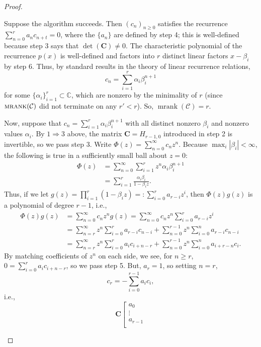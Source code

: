 \documentclass[12pt,reqno]{article}
\newcommand{\bC}{\mathbf{C}}
\newcommand{\malg}{\textsc{mrank}}
\DeclareMathOperator{\mrank}{mrank}
\begin{document}
\begin{proof}
\begin{description}
Suppose the algorithm succeeds.  Then $(c_n)_{n \geq 0}$ satisfies the recurrence $\sum_{n=0}^r a_n c_{n+t} = 0$, where the $\{a_n\}$ are defined by step 4; this is well-defined because step 3 says that $\det(\mathbf{C})\neq 0$.  The characteristic polynomial of the recurrence $p(x)$ is well-defined and factors into $r$ distinct linear factors $x-\beta_i$ by step 6.  Thus, by standard results in the theory of linear recurrence relations,
$$
c_n = \sum_{i=1}^r \alpha_i \beta_i^{n+1}
$$
for some $\{\alpha_i\}_{i=1}^r \subset \mathbb{C}$, which are nonzero by the minimality of $r$ (since $\malg(\mathcal{C})$ did not terminate on any $r' < r$).  So, $\mrank(\mathcal{C}) = r$.


Now, suppose that $c_n = \sum_{i=1}^r \alpha_i\beta_i^{n+1}$ with all distinct nonzero $\beta_i$ and nonzero values $\alpha_i$.  By $1 \Rightarrow 3$ above, the matrix $\mathbf{C} = H_{r-1,0}$ introduced in step 2 is invertible, so we pass step 3.  Write $\Phi(z) = \sum_{n=0}^\infty c_n z^n$.  Because $\max_i |\beta_i| < \infty$, the following is true in a sufficiently small ball about $z=0$:
\begin{align*}
\Phi(z) &= \sum_{n = 0}^\infty \sum_{i=1}^r z^n \alpha_i\beta_i^{n+1} \\
&= \sum_{i = 1}^r \frac{\alpha_i\beta_i}{1 - \beta_i z}.
\end{align*}
Thus, if we let $g(z) = \prod_{i=1}^r (1-\beta_i z) =: \sum_{i=0}^r a_{r-i} z^i$, then $\Phi(z)g(z)$ is a polynomial of degree $r-1$, i.e.,
\begin{align*}
\Phi(z)g(z) & = \sum_{n=0}^\infty c_n z^n g(z) = \sum_{n=0}^\infty c_n z^n \sum_{i=0}^r a_{r-i} z^i \\
& = \sum_{n=r}^\infty z^n \sum_{i=0}^r a_{r-i} c_{n-i} + \sum_{n=0}^{r-1} z^n \sum_{i=0}^n a_{r-i} c_{n-i} \\
& = \sum_{n=r}^\infty z^n \sum_{i=0}^r a_{i} c_{i+n-r} + \sum_{n=0}^{r-1} z^n \sum_{i=0}^n a_{i+r-n} c_{i}.
\end{align*}
By matching coefficients of $z^n$ on each side, we see, for $n \geq r$, $0 = \sum_{i=0}^r a_i c_{i+n-r}$, so we pass step 5.  But, $a_r = 1$, so setting $n = r$,
\begin{equation} \label{eq:thisrecurrence}
c_{r} = - \sum_{i=0}^{r-1} a_i c_{i},
\end{equation}
i.e.,
$$
\bC \left [ 
\begin{array}{c} 
a_0  \\
\vdots  \\
a_{r-1}  \\

\end{array}$$
\end{description}
\end{proof}
\end{document}

